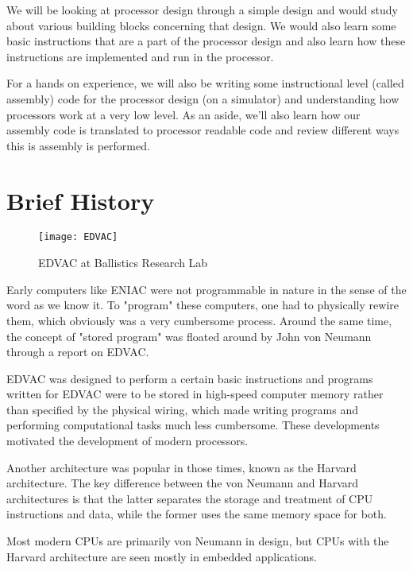 We will be looking at processor design through a simple design and would study about various building blocks concerning that design. We would also learn some basic instructions that are a part of the processor design and also learn how these instructions are implemented and run in the processor.

For a hands on experience, we will also be writing some instructional level (called assembly) code for the processor design (on a simulator) and understanding how processors work at a very low level. As an aside, we'll also learn how our assembly code is translated to processor readable code and review different ways this is assembly is performed.

\newpage


\section{Brief History}

\begin{wrapfigure}{r}{0.4\textwidth}
\caption{EDVAC at Ballistics Research Lab}
\label{fig:edvac}
\centering
\texttt{[image: EDVAC]}
\end{wrapfigure}

Early computers like ENIAC were not programmable in nature in the sense of the word as we know it. To "program" these computers, one had to physically rewire them, which obviously was a very cumbersome process. Around the same time, the concept of "stored program" was floated around by John von Neumann through a report on EDVAC. 

EDVAC was designed to perform a certain basic instructions and programs written for EDVAC were to be stored in high-speed computer memory rather than specified by the physical wiring, which made writing programs and performing computational tasks much less cumbersome. These developments motivated the development of modern processors. 

Another architecture was popular in those times, known as the Harvard architecture. The key difference between the von Neumann and Harvard architectures is that the latter separates the storage and treatment of CPU instructions and data, while the former uses the same memory space for both. 

\begin{remark}
Most modern CPUs are primarily von Neumann in design, but CPUs with the Harvard architecture are seen mostly in embedded applications.
\end{remark}

